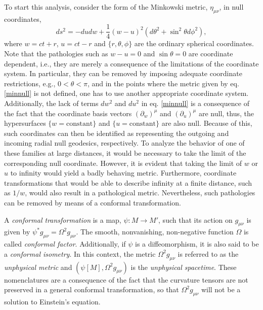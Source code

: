 \documentclass[
12pt,		%
openright,	%
twoside,  %
a4paper,			%
chapter=TITLE,		%
english,			%
french,				%
spanish,			%
brazil				%
]{USPSC-classe/USPSC}
\begin{document}
To start this analysis, consider the form of the Minkowski metric, $\eta_{\mu\nu}$, in null coordinates,
\begin{equation}\label{minnull}
    ds^2=-dudw+\frac{1}{4}(w-u)^2(d\theta^2+\sin^2\theta d\phi^2),
\end{equation}
where $w=ct+r$, $u=ct-r$ and $\{r,\theta,\phi\}$ are the ordinary spherical coordinates. Note that the pathologies such as $w-u=0$ and $\sin{\theta}=0$ are coordinate dependent, i.e., they are merely a consequence of the limitations of the coordinate system. In particular, they can be removed by imposing adequate coordinate restrictions, e.g., $0<\theta<\pi$, and in the points where the metric given by eq. \ref{minnull} is not defined, one has to use another appropriate coordinate system. Additionally, the lack of terms $dw^2$ and $du^2$ in eq. \ref{minnull} is a consequence of the fact that the coordinate basis vectors $(\partial_w)^{\mu}$ and $(\partial_u)^{\mu}$ are null, thus, the hypersurfaces $\{w=\text{constant}\}$ and $\{u=\text{constant}\}$ are also null. Because of this, such coordinates can then be identified as representing the outgoing and incoming radial null geodesics, respectively. To analyze the behavior of one of these families at large distances, it would be necessary to take the limit of the corresponding null coordinate. However, it is evident that taking the limit of $w$ or $u$ to infinity would yield a badly behaving metric. Furthermore, coordinate transformations that would be able to describe infinity at a finite distance, such as $1/w$, would also result in a pathological metric. Nevertheless, such pathologies can be removed by means of a conformal transformation.

A \textit{conformal transformation} is a map, $\psi:M\to M'$, such that its action on $g_{\mu\nu}$ is given by $\psi^* g_{\mu\nu}=\Omega^2g_{\mu\nu}$. The smooth, nonvanishing, non-negative function $\Omega$ is called \textit{conformal factor}. Additionally, if $\psi$ is a diffeomorphism, it is also said to be a \textit{conformal isometry}. In this context, the metric $\Omega^2g_{\mu\nu}$ is referred to as the \textit{unphysical metric} and $(\psi[M],\Omega^2g_{\mu\nu})$ is the \textit{unphysical spacetime}. These nomenclatures are a consequence of the fact that the curvature tensors are not preserved in a general conformal transformation, so that $\Omega^2g_{\mu\nu}$ will not be a solution to Einstein's equation.
\end{document}
